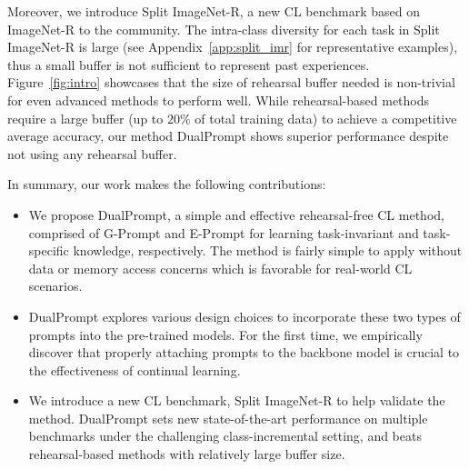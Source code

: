 \documentclass[runningheads]{llncs}
\newcommand{\zifeng}[1]{\textcolor{red}{Zifeng: #1}}
\newcommand{\method}{DualPrompt\xspace}
\newcommand{\gprompt}{G-Prompt\xspace}
\newcommand{\eprompt}{E-Prompt\xspace}
\begin{document}
Moreover, we introduce Split ImageNet-R, a new CL benchmark based on ImageNet-R \cite{hendrycks2020many} to the community. The intra-class diversity for each task in Split ImageNet-R is large (see Appendix~\ref{app:split_imr} for representative examples), thus a small buffer is not sufficient to represent past experiences. Figure~\ref{fig:intro} showcases that the size of rehearsal buffer needed is non-trivial for even advanced methods to perform well. 
While rehearsal-based methods require a large buffer (up to $20\%$ of total training data) to achieve a competitive average accuracy, our method \method shows superior performance despite not using any rehearsal buffer.

In summary, our work makes the following contributions:
\begin{itemize}
    \item We propose \method, a simple and effective rehearsal-free CL method, comprised of \gprompt and \eprompt for learning task-invariant and task-specific knowledge, respectively. The method is fairly simple to apply without data or memory access concerns which is favorable for real-world CL scenarios.
    
    \item \method explores various design choices to incorporate these two types of prompts into the pre-trained models. For the first time, we empirically discover that properly attaching prompts to the backbone model is crucial to the effectiveness of continual learning.

    \item  We introduce a new CL benchmark, Split ImageNet-R to help validate the method. %
    \method sets new state-of-the-art performance on multiple benchmarks under the challenging class-incremental setting, and beats rehearsal-based methods with relatively large buffer size. 
\end{itemize}
\end{document}
